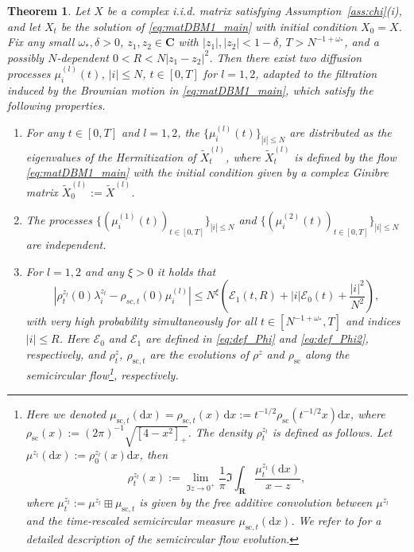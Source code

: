 \documentclass[10pt]{amsart}
\newtheorem{theorem}{Theorem}[section]
\numberwithin{equation}{section}
\newcommand{\dif}{\mathrm{d}}
\newcommand{\R}{\mathbf{R}}
\newcommand{\C}{\mathbf{C}}
\begin{document}
\begin{theorem}\label{eq:maintheoDBM1_main} Let $X$ be a complex i.i.d. matrix satisfying Assumption~\ref{ass:chi}(i), and let $X_t$ be the solution of \eqref{eq:matDBM1_main} with initial condition $X_0=X$. Fix any small $\omega_*, \delta>0$, $z_1,z_2\in\C$ with $|z_1|,|z_2|<1-\delta$, $T>N^{-1+\omega_*}$, and a possibly $N$-dependent $0<R<N|z_1-z_2|^2$. Then there exist two diffusion processes $\mu^{(l)}_{i}(t)$, $|i|\le N$, $t\in [0,T]$ for $l=1,2$, adapted to the filtration induced by the Brownian motion in \eqref{eq:matDBM1_main}, which satisfy the following properties.
\begin{enumerate}
\item[(i)] For any $t\in [0,T]$ and $l=1,2$, the $\{\mu^{(l)}_i(t)\}_{|i|\le N}$ are distributed as the eigenvalues of the Hermitization of $\widetilde{X}^{(l)}_t$, where $\widetilde{X}^{(l)}_t$ is defined by the flow \eqref{eq:matDBM1_main} with the initial condition given by a complex Ginibre matrix $\widetilde{X}^{(l)}_0:=\widetilde{X}^{(l)}$.
\item[(ii)] The processes $\{(\mu^{(1)}_i(t))_{t\in [0,T]}\}_{|i|\le N}$ and $\{(\mu^{(2)}_i(t))_{t\in [0,T]}\}_{|i|\le N}$ are independent.
\item[(iii)] For $l=1,2$ and any $\xi>0$ it holds that
\begin{equation}
\left\vert \rho_t^{z_l}(0)\lambda_i^{z_l}-\rho_{sc,t}(0)\mu_i^{(l)}\right\vert \le N^\xi \left(\mathcal{E}_1(t,R) + |i|\mathcal{E}_0(t) + \frac{|i|^2}{N^2}\right),
\label{eq:DBM_bound2}
\end{equation}
with very high probability simultaneously for all $t\in [N^{-1+\omega_*},T]$ and indices $|i|\le R$. Here $\mathcal{E}_0$ and $\mathcal{E}_1$ are defined in \eqref{eq:def_Phi} and \eqref{eq:def_Phi2}, respectively, and $\rho_t^z$, $\rho_{\mathrm{sc},t}$ are the evolutions of $\rho^z$ and $\rho_{\mathrm{sc}}$ along the semicircular flow\footnote{Here we denoted $\mu_{\mathrm{sc},t}(\dif x)=\rho_{\mathrm{sc},t}(x)\,\dif x:= t^{-1/2}\rho_{\mathrm{sc}}(t^{-1/2}x)\dif x$,  where $\rho_{\mathrm{sc}}(x):=(2\pi)^{-1}\sqrt{[4-x^2]_+}$. The density $\rho_t^{z_l}$ is defined as follows. Let $\mu^{z_l}(\dif x):=\rho_0^{z_l}(x)\dif x$, then
\[
\rho_t^{z_l}(x):=\lim_{\Im z\to 0^+}\frac{1}{\pi}\Im\int_\R \frac{\mu_t^{z_l}(\dif x)}{x-z},
\]
where $\mu_t^{z_l}:=\mu^{z_l}\boxplus \mu_{\mathrm{sc},t}$ is given by the free additive convolution between $\mu^{z_l}$ and the time-rescaled semicircular measure $\mu_{\mathrm{sc},t}(\dif x)$. We refer to \cite[Section~4.4]{bourgade2024fluctuations} for a detailed description of the semicircular flow evolution.}, respectively.
\end{enumerate}
\end{theorem}
\end{document}
